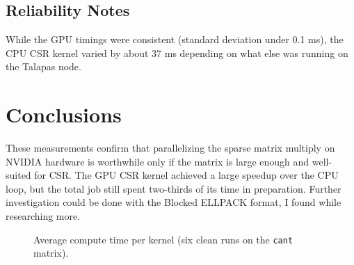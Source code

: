 \documentclass[11pt]{article}
\begin{document}
\subsection{Reliability Notes}
While the GPU timings were consistent (standard deviation under 0.1 ms), the CPU CSR kernel varied by about 37 ms depending on what else was running on the Talapas node.

\section{Conclusions}
These measurements confirm that parallelizing the sparse matrix multiply on NVIDIA hardware is worthwhile only if the matrix is large enough and well-suited for CSR. The GPU CSR kernel achieved a large speedup over the CPU loop, but the total job still spent two-thirds of its time in preparation. Further investigation could be done with the Blocked ELLPACK format, I found while researching more.

\begin{figure}[ht]
  \centering
  \caption{Average compute time per kernel (six clean runs on the \texttt{cant} matrix).}
  \label{fig:kernel_times}
\end{figure}
\end{document}
